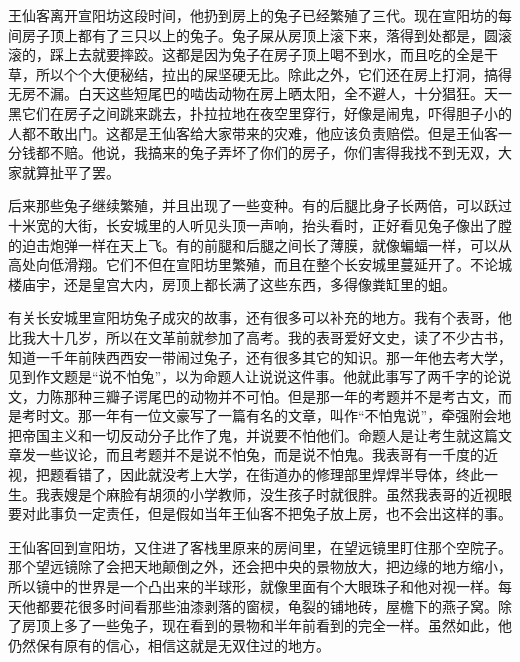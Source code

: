 王仙客离开宣阳坊这段时间，他扔到房上的兔子已经繁殖了三代。现在宣阳坊的每间房子顶上都有了三只以上的兔子。兔子屎从房顶上滚下来，落得到处都是，圆滚滚的，踩上去就要摔跤。这都是因为兔子在房子顶上喝不到水，而且吃的全是干草，所以个个大便秘结，拉出的屎坚硬无比。除此之外，它们还在房上打洞，搞得无房不漏。白天这些短尾巴的啮齿动物在房上晒太阳，全不避人，十分猖狂。天一黑它们在房子之间跳来跳去，扑拉拉地在夜空里穿行，好像是闹鬼，吓得胆子小的人都不敢出门。这都是王仙客给大家带来的灾难，他应该负责赔偿。但是王仙客一分钱都不赔。他说，我搞来的兔子弄坏了你们的房子，你们害得我找不到无双，大家就算扯平了罢。 

后来那些兔子继续繁殖，并且出现了一些变种。有的后腿比身子长两倍，可以跃过十米宽的大街，长安城里的人听见头顶一声响，抬头看时，正好看见兔子像出了膛的迫击炮弹一样在天上飞。有的前腿和后腿之间长了薄膜，就像蝙蝠一样，可以从高处向低滑翔。它们不但在宣阳坊里繁殖，而且在整个长安城里蔓延开了。不论城楼庙宇，还是皇宫大内，房顶上都长满了这些东西，多得像粪缸里的蛆。 

有关长安城里宣阳坊兔子成灾的故事，还有很多可以补充的地方。我有个表哥，他比我大十几岁，所以在文革前就参加了高考。我的表哥爱好文史，读了不少古书，知道一千年前陕西西安一带闹过兔子，还有很多其它的知识。那一年他去考大学，见到作文题是“说不怕兔”，以为命题人让说说这件事。他就此事写了两千字的论说文，力陈那种三瓣子谔尾巴的动物并不可怕。但是那一年的考题并不是考古文，而是考时文。那一年有一位文豪写了一篇有名的文章，叫作“不怕鬼说”，牵强附会地把帝国主义和一切反动分子比作了鬼，并说要不怕他们。命题人是让考生就这篇文章发一些议论，而且考题并不是说不怕兔，而是说不怕鬼。我表哥有一千度的近视，把题看错了，因此就没考上大学，在街道办的修理部里焊焊半导体，终此一生。我表嫂是个麻脸有胡须的小学教师，没生孩子时就很胖。虽然我表哥的近视眼要对此事负一定责任，但是假如当年王仙客不把兔子放上房，也不会出这样的事。 

王仙客回到宣阳坊，又住进了客栈里原来的房间里，在望远镜里盯住那个空院子。那个望远镜除了会把天地颠倒之外，还会把中央的景物放大，把边缘的地方缩小，所以镜中的世界是一个凸出来的半球形，就像里面有个大眼珠子和他对视一样。每天他都要花很多时间看那些油漆剥落的窗棂，龟裂的铺地砖，屋檐下的燕子窝。除了房顶上多了一些兔子，现在看到的景物和半年前看到的完全一样。虽然如此，他仍然保有原有的信心，相信这就是无双住过的地方。 

